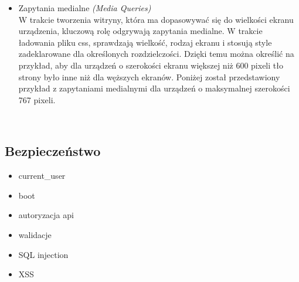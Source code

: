 \begin{itemize}
        \item Zapytania medialne \emph{(Media Queries)}\\
          W trakcie tworzenia witryny, która ma dopasowywać się do wielkości ekranu urządzenia, kluczową rolę odgrywają zapytania medialne. W trakcie ładowania pliku css, sprawdzają wielkość, rodzaj ekranu i stosują style zadeklarowane dla określonych rozdzielczości. Dzięki temu można określić na przykład, aby dla urządzeń o szerokości ekranu większej niż 600 pixeli tło strony było inne niż dla węższych ekranów.
          Poniżej został przedstawiony przykład z zapytaniami medialnymi dla
          urządzeń o maksymalnej szerokości 767 pixeli.
          \begin{code}
            
          \end{code}\\

      \end{itemize}
  \subsection{Bezpieczeństwo}
    \begin{itemize}
      \item current\_user
      \item boot
      \item autoryzacja api
      \item walidacje
      \item SQL injection
      \item XSS
    \end{itemize}

